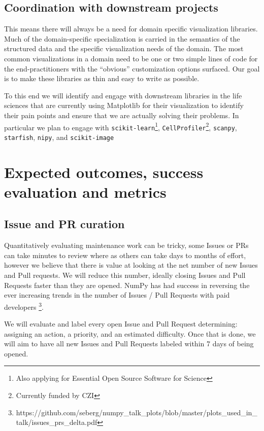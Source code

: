 \documentclass[11pt]{article}  %
\begin{document}
\subsection{Coordination with downstream projects}

This means there will
always be a need for domain specific visualization libraries.
Much of the domain-specific specialization is carried in the semantics
of the structured data and the specific visualization needs of the
domain.
The most common visualizations in a domain need to be one or
two simple lines of code for the end-practitioners with the ``obvious''
customization options surfaced.  Our goal is to make these
libraries as thin and easy to write as possible.


To this end we will identify and engage with downstream libraries in
the life sciences that are currently using Matplotlib for their
visualization to identify their pain points and ensure that we are
actually solving their problems.  In particular we plan to engage with
\texttt{scikit-learn}\footnote{Also applying for Essential Open Source
Software for Science}, \texttt{CellProfiler}\footnote{Currently funded
by CZI\label{f:czi}}, \texttt{scanpy},
\texttt{starfish}, \texttt{nipy}, and
\texttt{scikit-image}


\section{Expected outcomes, success evaluation and metrics}
\subsection{Issue and PR curation}

Quantitatively evaluating maintenance work can be tricky, some Issues
or PRs can take minutes to review where as others can take days to
months of effort, however we believe that there is value at looking at
the net number of new Issues and Pull requests.  We will reduce this
number, ideally closing Issues and Pull Requests faster than they are
opened.  NumPy has had success in reversing the ever increasing trends
in the number of Issues / Pull Requests with paid
developers \footnote{https://github.com/seberg/numpy\_talk\_plots/blob/master/plots\_used\_in\_talk/issues\_prs\_delta.pdf}.


We will evaluate and label every open Issue and Pull Request
determining: assigning an action, a priority, and an estimated
difficulty.  Once that is done, we will aim to have all new Issues and
Pull Requests labeled within 7 days of being opened.
\end{document}
